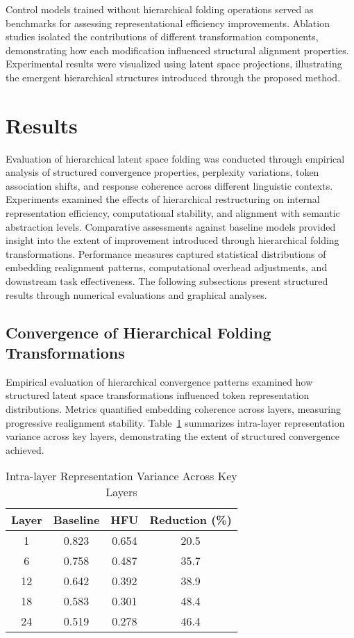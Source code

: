\documentclass[5p,times]{elsarticle}
\begin{document}
Control models trained without hierarchical folding operations served as benchmarks for assessing representational efficiency improvements. Ablation studies isolated the contributions of different transformation components, demonstrating how each modification influenced structural alignment properties. Experimental results were visualized using latent space projections, illustrating the emergent hierarchical structures introduced through the proposed method.


\section{Results}

Evaluation of hierarchical latent space folding was conducted through empirical analysis of structured convergence properties, perplexity variations, token association shifts, and response coherence across different linguistic contexts. Experiments examined the effects of hierarchical restructuring on internal representation efficiency, computational stability, and alignment with semantic abstraction levels. Comparative assessments against baseline models provided insight into the extent of improvement introduced through hierarchical folding transformations. Performance measures captured statistical distributions of embedding realignment patterns, computational overhead adjustments, and downstream task effectiveness. The following subsections present structured results through numerical evaluations and graphical analyses.

\subsection{Convergence of Hierarchical Folding Transformations}

Empirical evaluation of hierarchical convergence patterns examined how structured latent space transformations influenced token representation distributions. Metrics quantified embedding coherence across layers, measuring progressive realignment stability. Table~\ref{tab:embedding_variance} summarizes intra-layer representation variance across key layers, demonstrating the extent of structured convergence achieved.

\begin{table}[h]
	\centering
	\caption{Intra-layer Representation Variance Across Key Layers}
	\label{tab:embedding_variance}
	\begin{tabular}{|c|c|c|c|}
		\hline
		Layer & Baseline & HFU & Reduction (\%) \\
		\hline
		1 & 0.823 & 0.654 & 20.5 \\
		6 & 0.758 & 0.487 & 35.7 \\
		12 & 0.642 & 0.392 & 38.9 \\
		18 & 0.583 & 0.301 & 48.4 \\
		24 & 0.519 & 0.278 & 46.4 \\
		\hline
	\end{tabular}
\end{table}
\end{document}
